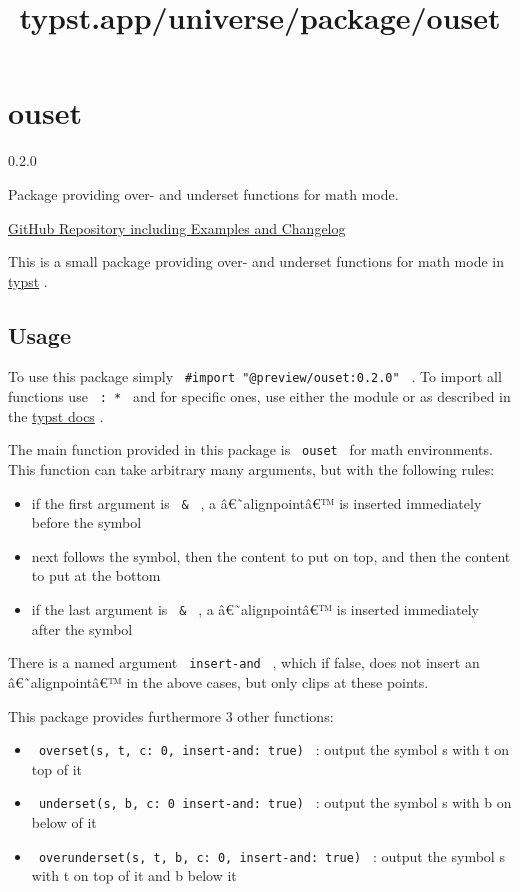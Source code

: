 \title{typst.app/universe/package/ouset}

\label{banner}
\section{ouset}\label{ouset}

{ 0.2.0 }

Package providing over- and underset functions for math mode.

\label{readme}
\href{https://github.com/ludwig-austermann/typst-ouset}{GitHub
Repository including Examples and Changelog}

This is a small package providing over- and underset functions for math
mode in \href{https://typst.app/}{typst} .

\subsection{Usage}\label{usage}

To use this package simply \texttt{\ \#import\ "@preview/ouset:0.2.0"\ }
. To import all functions use \texttt{\ :\ *\ } and for specific ones,
use either the module or as described in the
\href{https://typst.app/docs/reference/scripting\#modules}{typst docs} .

The main function provided in this package is \texttt{\ ouset\ } for
math environments. This function can take arbitrary many arguments, but
with the following rules:

\begin{itemize}
\tightlist
\item
  if the first argument is \texttt{\ \&\ } , a â€˜alignpointâ€™ is
  inserted immediately before the symbol
\item
  next follows the symbol, then the content to put on top, and then the
  content to put at the bottom
\item
  if the last argument is \texttt{\ \&\ } , a â€˜alignpointâ€™ is
  inserted immediately after the symbol
\end{itemize}

There is a named argument \texttt{\ insert-and\ } , which if false, does
not insert an â€˜alignpointâ€™ in the above cases, but only clips at
these points.

This package provides furthermore 3 other functions:

\begin{itemize}
\tightlist
\item
  \texttt{\ overset(s,\ t,\ c:\ 0,\ insert-and:\ true)\ } : output the
  symbol s with t on top of it
\item
  \texttt{\ underset(s,\ b,\ c:\ 0\ insert-and:\ true)\ } : output the
  symbol s with b on below of it
\item
  \texttt{\ overunderset(s,\ t,\ b,\ c:\ 0,\ insert-and:\ true)\ } :
  output the symbol s with t on top of it and b below it
\end{itemize}

